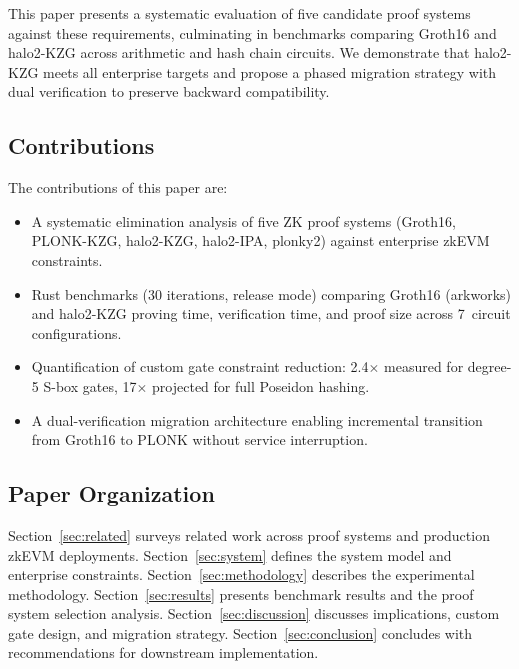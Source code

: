 This paper presents a systematic evaluation of five candidate proof
systems against these requirements, culminating in benchmarks
comparing Groth16 and halo2-KZG across arithmetic and hash chain
circuits. We demonstrate that halo2-KZG meets all enterprise targets
and propose a phased migration strategy with dual verification to
preserve backward compatibility.

\subsection{Contributions}

The contributions of this paper are:

\begin{itemize}
  \item A systematic elimination analysis of five ZK proof systems
    (Groth16, PLONK-KZG, halo2-KZG, halo2-IPA, plonky2) against
    enterprise zkEVM constraints.
  \item Rust benchmarks (30 iterations, release mode) comparing
    Groth16 (arkworks) and halo2-KZG proving time, verification time,
    and proof size across 7~circuit configurations.
  \item Quantification of custom gate constraint reduction: 2.4$\times$
    measured for degree-5 S-box gates, 17$\times$ projected for full
    Poseidon hashing.
  \item A dual-verification migration architecture enabling
    incremental transition from Groth16 to PLONK without service
    interruption.
\end{itemize}

\subsection{Paper Organization}

Section~\ref{sec:related} surveys related work across proof systems
and production zkEVM deployments. Section~\ref{sec:system} defines the
system model and enterprise constraints. Section~\ref{sec:methodology}
describes the experimental methodology. Section~\ref{sec:results}
presents benchmark results and the proof system selection analysis.
Section~\ref{sec:discussion} discusses implications, custom gate
design, and migration strategy. Section~\ref{sec:conclusion}
concludes with recommendations for downstream implementation.
